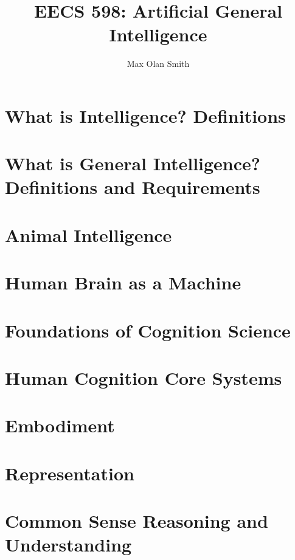 \documentclass[11pt]{article}
\title{EECS 598: Artificial General Intelligence}
\author{Max Olan Smith}
\begin{document}
\maketitle
\tableofcontents
\newpage

\section{What is Intelligence? Definitions}


\section{What is General Intelligence? Definitions and Requirements}


\section{Animal Intelligence}


\section{Human Brain as a Machine}


\section{Foundations of Cognition Science}


\section{Human Cognition Core Systems}


\section{Embodiment}


\section{Representation}


\section{Common Sense Reasoning and Understanding}

\end{document}
